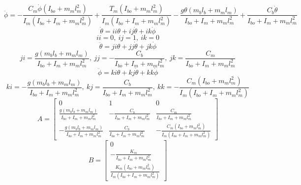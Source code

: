 \documentclass[12pt]{article}
\begin{document}
			\begin{equation}
				\ddot\phi = -\frac{C_m\dot\phi(I_{bo}+m_ml_m^2)}{I_m(I_{bo}+I_m+m_ml_m^2)} + 	\frac{T_m(I_{bo}+m_ml_m^2)}{I_m(I_{bo}+I_m+m_ml_m^2)} - \frac{g\theta(m_bl_b+m_ml_m)}{I_{bo}+I_m+m_ml_m^2} + \frac{C_b\dot\theta}{I_{bo}+I_m+m_ml_m^2}
			\end{equation}
			\begin{equation}
				\dot\theta = ii\theta + ij\dot\theta + ik\dot\phi
			\end{equation}
			\begin{equation}
				ii = 0,\ ij = 1,\ ik = 0
			\end{equation}
			\begin{equation}
				\ddot\theta = ji\theta + jj\dot\theta + jk\dot\phi
			\end{equation}
			\begin{equation}
				ji = \frac{g(m_bl_b+m_ml_m)}{I_{bo}+I_m+m_ml_m^2},\ jj = -\frac{C_b}{I_{bo}+I_m+m_ml_m^2},\ jk = 	\frac{C_m}{I_{bo}+I_m+m_ml_m^2}
			\end{equation}
			\begin{equation}
				\ddot\phi = ki\theta + kj\dot\theta + kk\dot\phi
			\end{equation}
			\begin{equation}
				ki = -\frac{g(m_bl_b+m_ml_m)}{I_{bo}+I_m+m_ml_m^2},\ kj = \frac{C_b}{I_{bo}+I_m+m_ml_m^2},\ kk = 	-\frac{C_m(I_{bo}+m_ml_m^2)}{I_m(I_{bo}+I_m+m_ml_m^2)}
			\end{equation}
			\begin{equation}
				\boxed{
					A = 
					\begin{bmatrix}
						0 & 1 & 0 \\ 
						\frac{g(m_bl_b+m_ml_m)}{I_{bo}+I_m+m_ml_m^2} & -\frac{C_b}{I_{bo}+I_m+m_ml_m^2} & 	\frac{C_m}{I_{bo}+I_m+m_ml_m^2} \\ 
						-\frac{g(m_bl_b+m_ml_m)}{I_{bo}+I_m+m_ml_m^2} & \frac{C_b}{I_{bo}+I_m+m_ml_m^2} & 	-\frac{C_m(I_{bo}+m_ml_m^2)}{I_m(I_{bo}+I_m+m_ml_m^2)}
					\end{bmatrix}
				}
			\end{equation}
			\begin{equation}
				\boxed{
				B = 
				\begin{bmatrix}
					0 \\ 
					-\frac{K_m}{I_{bo}+I_m+m_ml_m^2} \\
					\frac{K_m(I_{bo}+m_ml_m^2)}{I_m(I_{bo}+I_m+m_ml_m^2)}
				\end{bmatrix}
				}
			\end{equation}
\end{document}

